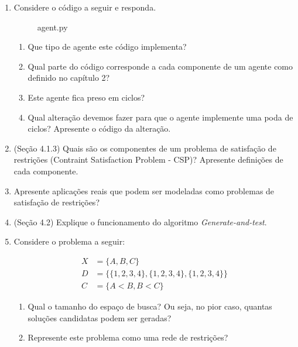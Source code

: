 \documentclass{article}
\begin{document}
\begin{enumerate}
\begin{enumerate}
    \end{enumerate} 

\item Considere o código a seguir e responda.

\begin{figure}[!ht]
    
    \caption{agent.py}
\end{figure}

\begin{enumerate}
    \item Que tipo de agente este código implementa?
    \item Qual parte do código corresponde a cada componente de um agente como definido no capítulo 2?
    \item Este agente fica preso em ciclos?
    \item Qual alteração devemos fazer para que o agente implemente uma poda de ciclos? Apresente o código da alteração. 
\end{enumerate}

\pagebreak

\item (Seção 4.1.3) Quais são os componentes de um problema de satisfação de restrições (Contraint Satisfaction Problem - CSP)? Apresente definições de cada componente.

\item Apresente aplicações reais que podem ser modeladas como problemas de satisfação de restrições?

\item (Seção 4.2) Explique o funcionamento do algoritmo \textit{Generate-and-test}.

\item Considere o problema a seguir:

\begin{align*}
    X &= \{A,B,C\} \\
    D &= \{\{1,2,3,4\},\{1,2,3,4\},\{1,2,3,4\} \}\\
    C &= \{ A < B, B < C \}    
\end{align*}

\begin{enumerate}
    \item Qual o tamanho do espaço de busca? Ou seja, no pior caso, quantas soluções candidatas podem ser geradas?
    \item Represente este problema como uma rede de restrições?
\end{enumerate}


\end{enumerate}
\end{document}
